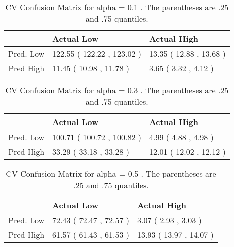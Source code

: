 \begin{table}[H]
\begin{center}
\begin{tabular}{rll}
  \hline
 & Actual Low & Actual High \\ 
  \hline
Pred. Low & 122.55 ( 122.22 , 123.02 ) & 13.35 ( 12.88 , 13.68 ) \\ 
  Pred High & 11.45 ( 10.98 , 11.78 ) & 3.65 ( 3.32 , 4.12 ) \\ 
   \hline
\end{tabular}
\caption{CV Confusion Matrix for alpha = 0.1 . The parentheses are .25 and .75 quantiles.}
\end{center}
\end{table}
\begin{table}[H]
\begin{center}
\begin{tabular}{rll}
  \hline
 & Actual Low & Actual High \\ 
  \hline
Pred. Low & 100.71 ( 100.72 , 100.82 ) & 4.99 ( 4.88 , 4.98 ) \\ 
  Pred High & 33.29 ( 33.18 , 33.28 ) & 12.01 ( 12.02 , 12.12 ) \\ 
   \hline
\end{tabular}
\caption{CV Confusion Matrix for alpha = 0.3 . The parentheses are .25 and .75 quantiles.}
\end{center}
\end{table}
\begin{table}[H]
\begin{center}
\begin{tabular}{rll}
  \hline
 & Actual Low & Actual High \\ 
  \hline
Pred. Low & 72.43 ( 72.47 , 72.57 ) & 3.07 ( 2.93 , 3.03 ) \\ 
  Pred High & 61.57 ( 61.43 , 61.53 ) & 13.93 ( 13.97 , 14.07 ) \\ 
   \hline
\end{tabular}
\caption{CV Confusion Matrix for alpha = 0.5 . The parentheses are .25 and .75 quantiles.}
\end{center}
\end{table}
